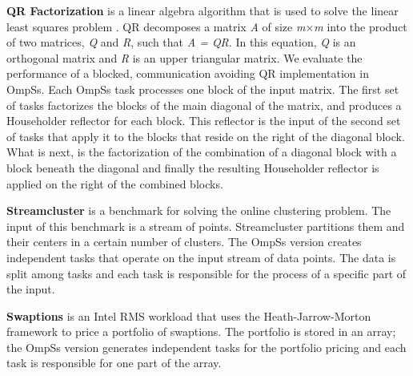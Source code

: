 \textbf{QR Factorization} is a linear algebra algorithm that is used to solve the linear least squares problem \cite{QR}. 
QR decomposes a matrix \textit{A} of size \textit{m$\times$m} into the product of two matrices, \textit{Q} and \textit{R}, such that \textit{A = QR}. 
In this equation, \textit{Q} is an orthogonal matrix and \textit{R} is an upper triangular matrix. 
We evaluate the performance of a blocked, communication avoiding QR implementation in OmpSs. 
Each OmpSs task processes one block of the input matrix. 
The first set of tasks factorizes the blocks of the main diagonal of the matrix, and produces a Householder reflector for each block. 
This reflector is the input of the second set of tasks that apply it to the blocks that reside on the right of the diagonal block. 
What is next, is the factorization of the combination of a diagonal block with a block beneath the diagonal and finally the resulting Householder reflector is applied on the right of the combined blocks. 

\textbf{Streamcluster} is a benchmark for solving the online clustering problem.
The input of this benchmark is a stream of points.
Streamcluster partitions them and their centers in a certain number of clusters.
The OmpSs version creates independent tasks that operate on the input stream of data points. 
The data is split among tasks and each task is responsible for the process of a specific part of the input.

\textbf{Swaptions} is an Intel RMS workload that uses the Heath-Jarrow-Morton framework to price a portfolio of swaptions. 
The portfolio is stored in an array; the OmpSs version generates independent tasks for the portfolio pricing and each task is responsible for one part of the array.







